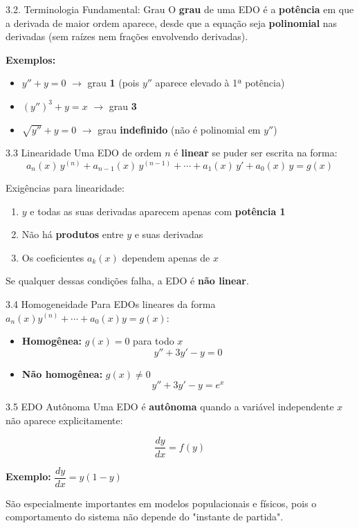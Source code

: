 \documentclass[11pt, aspectratio=169, xcolor=table]{beamer}
\begin{document}
\begin{frame}{3.2. Terminologia Fundamental: Grau}
O \textbf{grau} de uma EDO é a \textbf{potência} em que a derivada de maior ordem aparece, desde que a equação seja \textbf{polinomial} nas derivadas (sem raízes nem frações envolvendo derivadas).

\textbf{Exemplos:}
\begin{itemize}
  \item $y'' + y = 0$ $\rightarrow$ grau \textbf{1} (pois $y''$ aparece elevado à 1ª potência)
  \item $(y'')^3 + y = x$ $\rightarrow$ grau \textbf{3}
  \item $\sqrt{y''} + y = 0$ $\rightarrow$ grau \textbf{indefinido} (não é polinomial em $y''$)
\end{itemize}
\end{frame}

\begin{frame}{3.3 Linearidade}
Uma EDO de ordem $n$ é \textbf{linear} se puder ser escrita na forma:
\[
a_n(x)\,y^{(n)} + a_{n-1}(x)\,y^{(n-1)} + \cdots + a_1(x)\,y' + a_0(x)\,y = g(x)
\]

Exigências para linearidade:
\begin{enumerate}
  \item $y$ e todas as suas derivadas aparecem apenas com \textbf{potência 1}
  \item Não há \textbf{produtos} entre $y$ e suas derivadas
  \item Os coeficientes $a_k(x)$ dependem apenas de $x$
\end{enumerate}

Se qualquer dessas condições falha, a EDO é \textbf{não linear}.
\end{frame}

\begin{frame}{3.4 Homogeneidade}
Para EDOs lineares da forma $a_n(x)y^{(n)} + \cdots + a_0(x)y = g(x)$:

\begin{itemize}
  \item \textbf{Homogênea:} $g(x) = 0$ para todo $x$
  \[
    y'' + 3y' - y = 0
  \]
  \item \textbf{Não homogênea:} $g(x) \neq 0$
  \[
    y'' + 3y' - y = e^x
  \]
\end{itemize}
\end{frame}

\begin{frame}{3.5 EDO Autônoma}
Uma EDO é \textbf{autônoma} quando a variável independente $x$ não aparece explicitamente:

\[
\frac{dy}{dx} = f(y)
\]

\textbf{Exemplo:} $\dfrac{dy}{dx} = y(1 - y)$

São especialmente importantes em modelos populacionais e físicos, pois o comportamento do sistema não depende do "instante de partida".
\end{frame}
\end{document}
